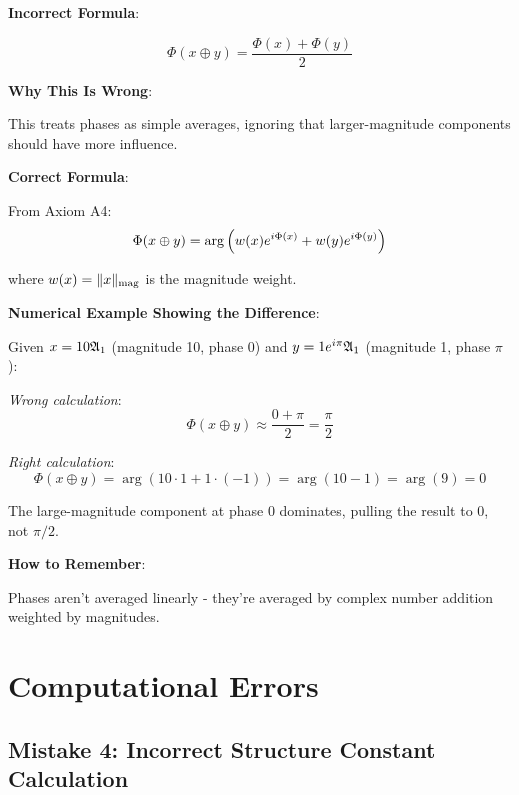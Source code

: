 \begin{warning}
\textbf{Incorrect Formula}:

$$\Phi(x \oplus y) = \frac{\Phi(x) + \Phi(y)}{2}$$

\textbf{Why This Is Wrong}:

This treats phases as simple averages, ignoring that larger-magnitude components should have more influence.

\textbf{Correct Formula}:

From Axiom A4:
$$\Phi(x \oplus y) = \arg\left(w(x) e^{i\Phi(x)} + w(y) e^{i\Phi(y)}\right)$$

where $w(x) = \|x\|_{\text{mag}}$ is the magnitude weight.

\textbf{Numerical Example Showing the Difference}:

Given $x = 10\mathfrak{A}_{1}$ (magnitude 10, phase 0) and $y = 1e^{i\pi}\mathfrak{A}_{1}$ (magnitude 1, phase $\pi$):

\textit{Wrong calculation}:
$$\Phi(x \oplus y) \approx \frac{0 + \pi}{2} = \frac{\pi}{2}$$

\textit{Right calculation}:
$$\Phi(x \oplus y) = \arg(10 \cdot 1 + 1 \cdot (-1)) = \arg(10 - 1) = \arg(9) = 0$$

The large-magnitude component at phase 0 dominates, pulling the result to 0, not $\pi/2$.

\textbf{How to Remember}:

Phases aren't averaged linearly - they're averaged by complex number addition weighted by magnitudes.
\end{warning}

\section{Computational Errors}

\subsection{Mistake 4: Incorrect Structure Constant Calculation}

